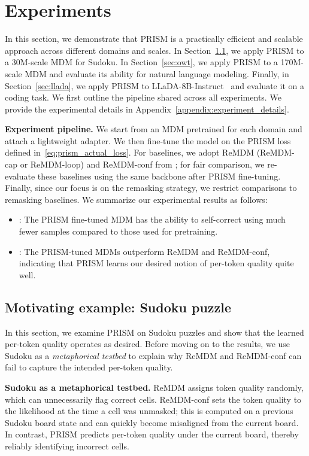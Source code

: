\section{Experiments}
\label{sec:experiment}
In this section, we demonstrate that PRISM is a practically efficient and scalable approach across different domains and scales. In Section~\ref{sec:sudoku}, we apply PRISM to a $30$M-scale MDM for Sudoku. In Section~\ref{sec:owt}, we apply PRISM to a 170M-scale MDM and evaluate its ability for natural language modeling. Finally, in Section~\ref{sec:llada}, we apply PRISM to LLaDA-8B-Instruct~\citep{nie2025large} and evaluate it on a coding task. We first outline the pipeline shared across all experiments. We provide the experimental details in Appendix~\ref{appendix:experiment_details}.

\textbf{Experiment pipeline.} 
We start from an MDM pretrained for each domain and attach a lightweight adapter. We then fine-tune the model on the PRISM loss defined in~\eqref{eq:prism_actual_loss}. For baselines, we adopt ReMDM (ReMDM-cap or ReMDM-loop) and ReMDM-conf from \citet{wang2025remasking}; for fair comparison, we re-evaluate these baselines using the same backbone after PRISM fine-tuning. Finally, since our focus is on the remasking strategy, we restrict comparisons to remasking baselines. We summarize our experimental results as follows:
\begin{itemize}[leftmargin=10pt, noitemsep, parsep=3pt, topsep=0pt]
    \item {}: The PRISM fine-tuned MDM has the ability to self-correct using much fewer samples compared to those used for pretraining.
    \item {}: The PRISM-tuned MDMs outperform ReMDM and ReMDM-conf, indicating that PRISM learns our desired notion of per-token quality quite well.
\end{itemize}

\subsection{Motivating example: Sudoku puzzle}   \label{sec:sudoku}
In this section, we examine PRISM on Sudoku puzzles and show that the learned per-token quality operates as desired.
Before moving on to the results, we use Sudoku as a \emph{metaphorical testbed} to explain why ReMDM and ReMDM-conf can fail to capture the intended per-token quality.

\textbf{Sudoku as a metaphorical testbed.}
ReMDM assigns token quality randomly, which can unnecessarily flag correct cells. ReMDM-conf sets the token quality to the likelihood at the time a cell was unmasked; this is computed on a previous Sudoku board state and can quickly become misaligned from the current board. In contrast, PRISM predicts per-token quality under the current board, thereby reliably identifying incorrect cells.

